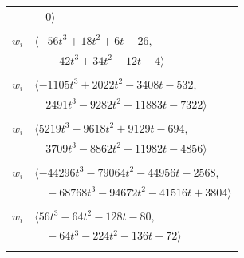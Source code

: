 \documentclass[11pt]{article}
\begin{document}
\begin{longtable}{@{}ll@{}}
 & $\quad 0\rangle$\\
\addlinespace[2pt]
\multicolumn{2}{@{}p{0.97\textwidth}@{}}{$i=41$, $D_i=2$, $\rho_{ij}$: $5{:}2, \allowbreak 7{:}2, \allowbreak 20{:}1, \allowbreak 26{:}1, \allowbreak 28{:}2, \allowbreak 34{:}2, \allowbreak 43{:}2, \allowbreak 64{:}1, \allowbreak 65{:}1$}\\
$w_i$ & $\langle -56t^{3}+18t^{2}+6t-26,$\\
 & $\quad -42t^{3}+34t^{2}-12t-4\rangle$\\
\addlinespace[2pt]
\multicolumn{2}{@{}p{0.97\textwidth}@{}}{$i=42$, $D_i=16$, $\rho_{ij}$: $5{:}2, \allowbreak 7{:}2, \allowbreak 8{:}2, \allowbreak 10{:}1, \allowbreak 11{:}1, \allowbreak 14{:}1, \allowbreak 20{:}2, \allowbreak 33{:}1, \allowbreak 36{:}2, \allowbreak 37{:}1, \allowbreak 45{:}2, \allowbreak 58{:}1, \allowbreak 60{:}2, \allowbreak 61{:}2$}\\
$w_i$ & $\langle -1105t^{3}+2022t^{2}-3408t-532,$\\
 & $\quad 2491t^{3}-9282t^{2}+11883t-7322\rangle$\\
\addlinespace[2pt]
\multicolumn{2}{@{}p{0.97\textwidth}@{}}{$i=43$, $D_i=8$, $\rho_{ij}$: $9{:}1, \allowbreak 22{:}1, \allowbreak 26{:}2, \allowbreak 27{:}2, \allowbreak 31{:}2, \allowbreak 40{:}1, \allowbreak 41{:}1, \allowbreak 53{:}2, \allowbreak 54{:}2, \allowbreak 59{:}2$}\\
$w_i$ & $\langle 5219t^{3}-9618t^{2}+9129t-694,$\\
 & $\quad 3709t^{3}-8862t^{2}+11982t-4856\rangle$\\
\addlinespace[2pt]
\multicolumn{2}{@{}p{0.97\textwidth}@{}}{$i=44$, $D_i=8$, $\rho_{ij}$: $3{:}2, \allowbreak 16{:}2, \allowbreak 22{:}1, \allowbreak 32{:}2, \allowbreak 45{:}2, \allowbreak 48{:}1, \allowbreak 50{:}2, \allowbreak 56{:}2$}\\
$w_i$ & $\langle -44296t^{3}-79064t^{2}-44956t-2568,$\\
 & $\quad -68768t^{3}-94672t^{2}-41516t+3804\rangle$\\
\addlinespace[2pt]
\multicolumn{2}{@{}p{0.97\textwidth}@{}}{$i=45$, $D_i=16$, $\rho_{ij}$: $5{:}1, \allowbreak 7{:}2, \allowbreak 19{:}2, \allowbreak 42{:}1, \allowbreak 44{:}1, \allowbreak 53{:}2, \allowbreak 55{:}1, \allowbreak 60{:}1, \allowbreak 62{:}1, \allowbreak 63{:}1$}\\
$w_i$ & $\langle 56t^{3}-64t^{2}-128t-80,$\\
 & $\quad -64t^{3}-224t^{2}-136t-72\rangle$\\
\addlinespace[2pt]

\end{longtable}
\end{document}
